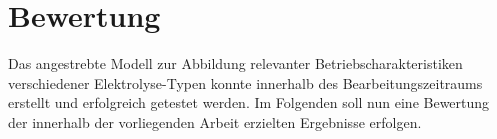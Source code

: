 \documentclass[onecolumn,10pt,titlepage]{article}
\begin{document}
%
%
%
%

\section{Bewertung}
Das angestrebte Modell zur Abbildung relevanter Betriebscharakteristiken verschiedener Elektrolyse-Typen konnte innerhalb des Bearbeitungszeitraums erstellt und erfolgreich getestet werden. Im Folgenden soll nun eine Bewertung der innerhalb der vorliegenden Arbeit erzielten Ergebnisse erfolgen.
\end{document}
